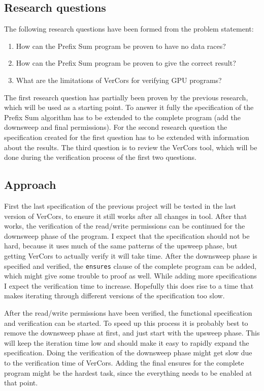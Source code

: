 \documentclass[a4paper]{article}
\newcommand{\code}[1]{\texttt{\small \color{inline}#1}} %
\begin{document}
\subsection{Research questions}
The following research questions have been formed from the problem statement:
\begin{enumerate}
	\item How can the Prefix Sum program be proven to have no data races?
	\item How can the Prefix Sum program be proven to give the correct result?
	\item What are the limitations of VerCors for verifying GPU programs?
\end{enumerate}

The first research question has partially been proven by the previous research, which will be used as a starting point. To answer it fully the specification of the Prefix Sum algorithm has to be extended to the complete program (add the downsweep and final permissions). For the second research question the specification created for the first question has to be extended with information about the results. The third question is to review the VerCors tool, which will be done during the verification process of the first two questions.

\subsection{Approach}
First the last specification of the previous project will be tested in the last version of VerCors, to ensure it still works after all changes in tool. After that works, the verification of the read/write permissions can be continued for the downsweep phase of the program. I expect that the specification should not be hard, because it uses much of the same patterns of the upsweep phase, but getting VerCors to actually verify it will take time. After the downsweep phase is specified and verified, the \code{ensures} clause of the complete program can be added, which might give some trouble to proof as well. While adding more specifications I expect the verification time to increase. Hopefully this does rise to a time that makes iterating through different versions of the specification too slow.

After the read/write permissions have been verified, the functional specification and verification can be started. To speed up this process it is probably best to remove the downsweep phase at first, and just start with the upsweep phase. This will keep the iteration time low and should make it easy to rapidly expand the specification. Doing the verification of the downsweep phase might get slow due to the verification time of VerCors. Adding the final ensures for the complete program might be the hardest task, since the everything needs to be enabled at that point.
\end{document}
